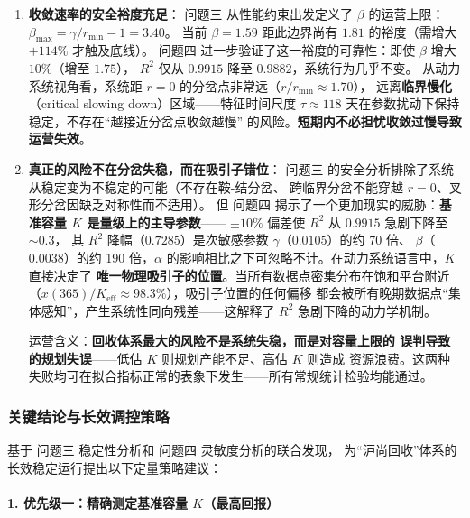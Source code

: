 \documentclass[12pt,a4paper]{ctexart}
\begin{document}
\begin{table}[htbp]
\begin{enumerate}
  \item \textbf{收敛速率的安全裕度充足}：
        问题三 从性能约束出发定义了 $\beta$ 的运营上限：
        $\beta_{\max} = \gamma/r_{\min} - 1 = 3.40$。
        当前 $\beta = 1.59$ 距此边界尚有 $1.81$ 的裕度（需增大 $+114\%$ 才触及底线）。
        问题四 进一步验证了这一裕度的可靠性：即使 $\beta$ 增大 $10\%$（增至 $1.75$），
        $R^2$ 仅从 $0.9915$ 降至 $0.9882$，系统行为几乎不变。
        从动力系统视角看，系统距 $r = 0$ 的分岔点非常远（$r/r_{\min} \approx 1.70$），
        远离\textbf{临界慢化}（critical slowing down）区域——特征时间尺度
        $\tau \approx 118$ 天在参数扰动下保持稳定，不存在``越接近分岔点收敛越慢''
        的风险。\textbf{短期内不必担忧收敛过慢导致运营失效}。

  \item \textbf{真正的风险不在分岔失稳，而在吸引子错位}：
        问题三 的安全分析排除了系统从稳定变为不稳定的可能（不存在鞍-结分岔、
        跨临界分岔不能穿越 $r = 0$、叉形分岔因缺乏对称性而不适用）。
        但 问题四 揭示了一个更加现实的威胁：\textbf{基准容量 $K$ 是量级上的主导参数}——
        $\pm 10\%$ 偏差使 $R^2$ 从 $0.9915$ 急剧下降至 $\sim 0.3$，
        其 $R^2$ 降幅（$0.7285$）是次敏感参数 $\gamma$（$0.0105$）的约 70 倍、
        $\beta$（$0.0038$）的约 190 倍，$\alpha$ 的影响相比之下可忽略不计。在动力系统语言中，$K$ 直接决定了
        \textbf{唯一物理吸引子的位置}。当所有数据点密集分布在饱和平台附近
        （$x(365)/K_{\text{eff}} \approx 98.3\%$），吸引子位置的任何偏移
        都会被所有晚期数据点``集体感知''，产生系统性同向残差——这解释了
        $R^2$ 急剧下降的动力学机制。

        运营含义：\textbf{回收体系最大的风险不是系统失稳，而是对容量上限的
        误判导致的规划失误}——低估 $K$ 则规划产能不足、高估 $K$ 则造成
        资源浪费。这两种失败均可在拟合指标正常的表象下发生——所有常规统计检验均能通过。
\end{enumerate}

\subsubsection{关键结论与长效调控策略}

基于 问题三 稳定性分析和 问题四 灵敏度分析的联合发现，
为``沪尚回收''体系的长效稳定运行提出以下定量策略建议：

\paragraph*{1. 优先级一：精确测定基准容量 $K$（最高回报）}


\end{table}
\end{document}
